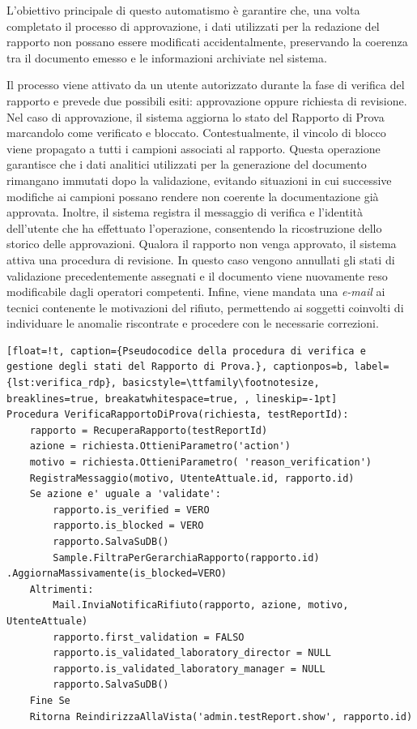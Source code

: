 L'obiettivo principale di questo automatismo è garantire che, una volta completato il processo di approvazione, i dati utilizzati per la redazione del rapporto non possano essere modificati accidentalmente, preservando la coerenza tra il documento emesso e le informazioni archiviate nel sistema.

Il processo viene attivato da un utente autorizzato durante la fase di verifica del rapporto e prevede due possibili esiti: approvazione oppure richiesta di revisione.
Nel caso di approvazione, il sistema aggiorna lo stato del Rapporto di Prova marcandolo come verificato e bloccato. Contestualmente, il vincolo di blocco viene propagato a tutti i campioni associati al rapporto. Questa operazione garantisce che i dati analitici utilizzati per la generazione del documento rimangano immutati dopo la validazione, evitando situazioni in cui successive modifiche ai campioni possano rendere non coerente la documentazione già approvata. Inoltre, il sistema registra il messaggio di verifica e l'identità dell'utente che ha effettuato l'operazione, consentendo la ricostruzione dello storico delle approvazioni.
Qualora il rapporto non venga approvato, il sistema attiva una procedura di revisione. In questo caso vengono annullati gli stati di validazione precedentemente assegnati e il documento viene nuovamente reso modificabile dagli operatori competenti. Infine, viene mandata una \textit{e-mail} ai tecnici contenente le motivazioni del rifiuto, permettendo ai soggetti coinvolti di individuare le anomalie riscontrate e procedere con le necessarie correzioni.

\begin{lstlisting}[float=!t, caption={Pseudocodice della procedura di verifica e gestione degli stati del Rapporto di Prova.}, captionpos=b, label={lst:verifica_rdp}, basicstyle=\ttfamily\footnotesize, breaklines=true, breakatwhitespace=true, , lineskip=-1pt]
Procedura VerificaRapportoDiProva(richiesta, testReportId):
	rapporto = RecuperaRapporto(testReportId)
	azione = richiesta.OttieniParametro('action')
	motivo = richiesta.OttieniParametro( 'reason_verification')
	RegistraMessaggio(motivo, UtenteAttuale.id, rapporto.id)
	Se azione e' uguale a 'validate':
		rapporto.is_verified = VERO
		rapporto.is_blocked = VERO
		rapporto.SalvaSuDB()
		Sample.FiltraPerGerarchiaRapporto(rapporto.id) .AggiornaMassivamente(is_blocked=VERO)
	Altrimenti:
		Mail.InviaNotificaRifiuto(rapporto, azione, motivo, UtenteAttuale)
		rapporto.first_validation = FALSO
		rapporto.is_validated_laboratory_director = NULL
		rapporto.is_validated_laboratory_manager = NULL
		rapporto.SalvaSuDB()
	Fine Se
	Ritorna ReindirizzaAllaVista('admin.testReport.show', rapporto.id)
\end{lstlisting}
